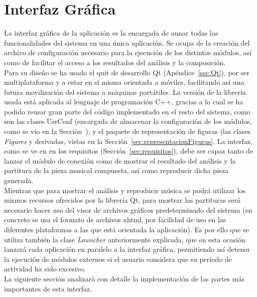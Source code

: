\section{Interfaz Gráfica}
\label{sec:arqgui}


La interfaz gráfica de la aplicación es la encargada de aunar todas las funcionalidades del sistema en una única aplicación. Se ocupa de la creación del archivo de configuración necesario para la ejecución de los distintos módulos, así como de facilitar el acceso a los resultados del análisis y la composición.\\

Para su diseño se ha usado el quit de desarrollo Qt (Apéndice~\ref{sec:Qt}), por ser multiplataforma y a estar en sí misma orientada a móviles, facilitando así una futura movilización del sistema a máquinas portátiles. La versión de la librería usada está aplicada al lenguaje de programación C++, gracias a lo cual se ha podido reusar gran parte del código implementado en el resto del sistema, como son las clases UsrConf (encargada de almacenar la configuración de los módulos, como se vio en la Sección~\cite{sec:arqMuphic}), y el paquete de representación de figuras (las clases \emph{Figures} y derivadas, vistas en la Sección~\ref{sec:representacionFiguras}. La interfaz, como se ve en en los requisitos (Sección~\ref{sec:requisitos}), debe ser capaz tanto de lanzar el módulo de conexión como de mostrar el resultado del análisis y la partitura de la pieza musical compuesta, así como reproducir dicha pieza generada.\\

Mientras que para mostrar el análisis y reproducir música se podrá utilizar los mismos recursos ofrecidos por la librería Qt, para mostrar las partituras será necesario hacer uso del visor de archivos gráficos predeterminado del sistema (en concreto se usa el formato de archivos xhtml, por facilidad de uso en las diferentes plataformas a las que está orientada la aplicación). Es por ello que se utiliza también la clase \emph{Launcher} anteriormente explicada, que en esta ocasión lanzará cada aplicación en paralelo a la interfaz gráfica, permitiendo así detener la ejecución de módulos externos si el usuario considera que su período de actividad ha sido excesivo.\\

La siguiente sección analizará con detalle la implementación de las partes más importantes de esta interfaz.

